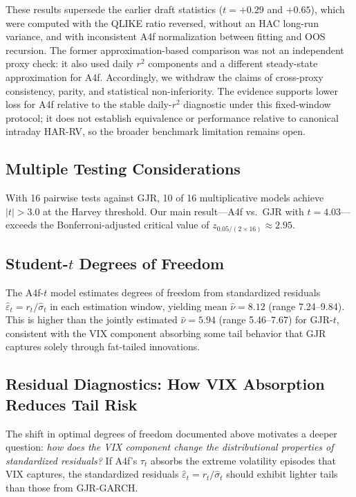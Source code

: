 \documentclass[12pt,a4paper]{article}
\begin{document}
These results supersede the earlier draft statistics ($t=+0.29$ and $+0.65$), which were computed with the QLIKE ratio reversed, without an HAC long-run variance, and with inconsistent A4f normalization between fitting and OOS recursion.  The former approximation-based comparison was not an independent proxy check: it also used daily $r^2$ components and a different steady-state approximation for A4f.  Accordingly, we withdraw the claims of cross-proxy consistency, parity, and statistical non-inferiority.  The evidence supports lower loss for A4f relative to the stable daily-$r^2$ diagnostic under this fixed-window protocol; it does not establish equivalence or performance relative to canonical intraday HAR-RV, so the broader benchmark limitation remains open.

\subsection{Multiple Testing Considerations}

With 16 pairwise tests against GJR, 10 of 16 multiplicative models achieve $|t| > 3.0$ at the Harvey threshold. Our main result---A4f vs.\ GJR with $t = 4.03$---exceeds the Bonferroni-adjusted critical value of $z_{0.05/(2 \times 16)} \approx 2.95$.

\subsection{Student-$t$ Degrees of Freedom}

The A4f-$t$ model estimates degrees of freedom from standardized residuals $\hat\varepsilon_t = r_t / \hat\sigma_t$ in each estimation window, yielding mean $\hat\nu = 8.12$ (range 7.24--9.84). This is higher than the jointly estimated $\hat\nu = 5.94$ (range 5.46--7.67) for GJR-$t$, consistent with the VIX component absorbing some tail behavior that GJR captures solely through fat-tailed innovations.

\subsection{Residual Diagnostics: How VIX Absorption Reduces Tail Risk}
\label{sec:residual_diagnostics}

The shift in optimal degrees of freedom documented above motivates a deeper question: \emph{how does the VIX component change the distributional properties of standardized residuals?} If A4f's $\tau_t$ absorbs the extreme volatility episodes that VIX captures, the standardized residuals $\hat\varepsilon_t = r_t / \hat\sigma_t$ should exhibit lighter tails than those from GJR-GARCH.
\end{document}
